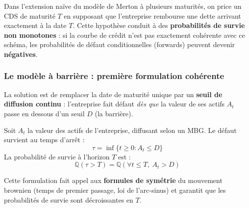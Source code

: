 Dans l'extension naïve du modèle de Merton à plusieurs maturités, on price un CDS de maturité $T$ en supposant que l'entreprise rembourse une dette arrivant exactement à la date $T$. Cette hypothèse conduit à des \textbf{probabilités de survie non monotones} : si la courbe de crédit n'est pas exactement cohérente avec ce schéma, les probabilités de défaut conditionnelles (forwards) peuvent devenir \textbf{négatives}.

\subsubsection{Le modèle à barrière : première formulation cohérente}

La solution est de remplacer la date de maturité unique par un \textbf{seuil de diffusion continu} : l'entreprise fait défaut \textit{dès que} la valeur de ses actifs $A_t$ passe en dessous d'un seuil $D$ (la barrière).

\begin{definition}
Soit $A_t$ la valeur des actifs de l'entreprise, diffusant selon un MBG. Le défaut survient au temps d'arrêt :
\[
\tau = \inf\{t \geq 0 : A_t \leq D\}
\]
La probabilité de survie à l'horizon $T$ est :
\[
\mathbb{Q}(\tau > T) = \mathbb{Q}\!\left(\forall t \leq T,\; A_t > D\right)
\]
\end{definition}

Cette formulation fait appel aux \textbf{formules de symétrie} du mouvement brownien (temps de premier passage, loi de l'arc-sinus) et garantit que les probabilités de survie sont décroissantes en $T$.

